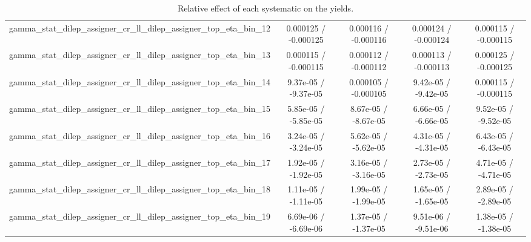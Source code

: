 \documentclass[10pt]{article}
\begin{document}
\begin{table}[htbp]
\begin{center}
\begin{tabular}{|c|c|c|c|c|}
  gamma_stat_dilep_assigner_cr_ll_dilep_assigner_top_eta_bin_12 & 0.000125 / -0.000125 & 0.000116 / -0.000116 & 0.000124 / -0.000124 & 0.000115 / -0.000115 \\ 
  gamma_stat_dilep_assigner_cr_ll_dilep_assigner_top_eta_bin_13 & 0.000115 / -0.000115 & 0.000112 / -0.000112 & 0.000113 / -0.000113 & 0.000125 / -0.000125 \\ 
  gamma_stat_dilep_assigner_cr_ll_dilep_assigner_top_eta_bin_14 & 9.37e-05 / -9.37e-05 & 0.000105 / -0.000105 & 9.42e-05 / -9.42e-05 & 0.000115 / -0.000115 \\ 
  gamma_stat_dilep_assigner_cr_ll_dilep_assigner_top_eta_bin_15 & 5.85e-05 / -5.85e-05 & 8.67e-05 / -8.67e-05 & 6.66e-05 / -6.66e-05 & 9.52e-05 / -9.52e-05 \\ 
  gamma_stat_dilep_assigner_cr_ll_dilep_assigner_top_eta_bin_16 & 3.24e-05 / -3.24e-05 & 5.62e-05 / -5.62e-05 & 4.31e-05 / -4.31e-05 & 6.43e-05 / -6.43e-05 \\ 
  gamma_stat_dilep_assigner_cr_ll_dilep_assigner_top_eta_bin_17 & 1.92e-05 / -1.92e-05 & 3.16e-05 / -3.16e-05 & 2.73e-05 / -2.73e-05 & 4.71e-05 / -4.71e-05 \\ 
  gamma_stat_dilep_assigner_cr_ll_dilep_assigner_top_eta_bin_18 & 1.11e-05 / -1.11e-05 & 1.99e-05 / -1.99e-05 & 1.65e-05 / -1.65e-05 & 2.89e-05 / -2.89e-05 \\ 
  gamma_stat_dilep_assigner_cr_ll_dilep_assigner_top_eta_bin_19 & 6.69e-06 / -6.69e-06 & 1.37e-05 / -1.37e-05 & 9.51e-06 / -9.51e-06 & 1.38e-05 / -1.38e-05 \\ 
\hline 
\end{tabular} 
\caption{Relative effect of each systematic on the yields.} 
\end{center} 
\end{table} 
\end{document}

